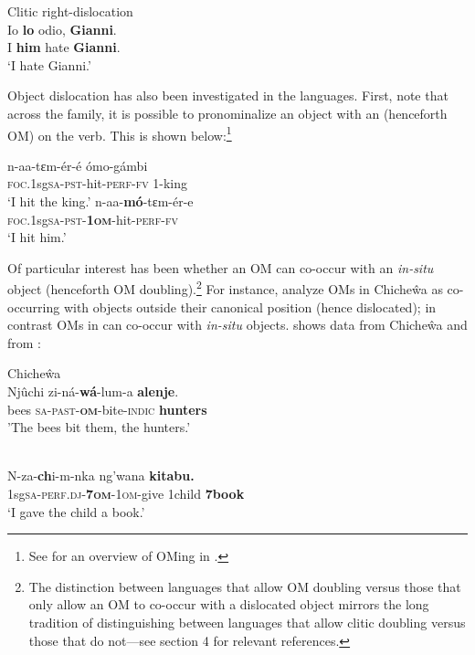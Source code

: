 \documentclass[output=paper
,newtxmath
,modfonts
,nonflat]{langsci/langscibook}
\begin{document}
\ex\label{ex:ranero:2b} Clitic right-dislocation\\
\gll Io \textbf{lo}    odio, \textbf{Gianni}. \\
I   \textbf{him} hate  \textbf{Gianni}.\\
\glt ‘I hate Gianni.’ 
\z
\z

Object dislocation has also been investigated in the  languages. First, note that across the family, it is possible to pronominalize an object with an  (henceforth OM) on the verb. This is shown below:\footnote{See \citet{Marlo2015} for an overview of OMing in .}

\ea\label{ex:ranero:3}
 \citep{diercks2015}
\ea\label{ex:ranero:3a}
\gll n-aa-tɛm-ér-é       ómo-gámbi\\
\textsc{foc}.1sg\textsc{sa}{}-\textsc{pst}{}-hit-\textsc{perf-fv} 1-king  \\
\glt ‘I hit the king.’
\ex\label{ex:ranero:3b}
\gll n-aa-\textbf{mó}{}-tɛm-ér-e \\
\textsc{foc}.1sg\textsc{sa}{}-\textsc{pst}{}-\textbf{1\textsc{om}}{}-hit-\textsc{perf-fv}\\
\glt ‘I hit him.’
\z
\z

Of particular interest has been whether an OM can co-occur with an \textit{in-situ} object (henceforth OM doubling).\footnote{The distinction between  languages that allow OM doubling versus those that only allow an OM to co-occur with a dislocated object mirrors the long tradition of distinguishing between languages that allow clitic doubling versus those that do not—see section 4 for relevant references.} For instance, \citet{Bresnan1987} analyze OMs in Chiche\^wa as co-occurring with objects outside their canonical position (hence dislocated); in contrast OMs in  can co-occur with \textit{in-situ} objects.  shows data from Chiche\^wa and  from :

\ea\label{ex:ranero:4}
Chiche\^wa \citep{Bresnan1987}\\
\gll Njûchi zi-ná-\textbf{wá}{}-lum-a            \textbf{alenje}.\\
bees     \textsc{sa-past-}\textbf{\textsc{om}}{}-bite-\textsc{indic} \textbf{hunters}\\
\glt 'The bees bit them, the hunters.’
\z

\ea\label{ex:ranero:5}
 \citep{Riedel2009}\\
\gll N-za-\textbf{ch}i-m{}-nka             ng’wana \textbf{kitabu.}   \\
1sg\textsc{sa-perf.dj}{}-\textbf{\textsc{7om}}\textsc{{}-}\textsc{1om}{}-give 1child     \textbf{7book}\\
\glt ‘I gave the child a book.’
\z
\end{document}
